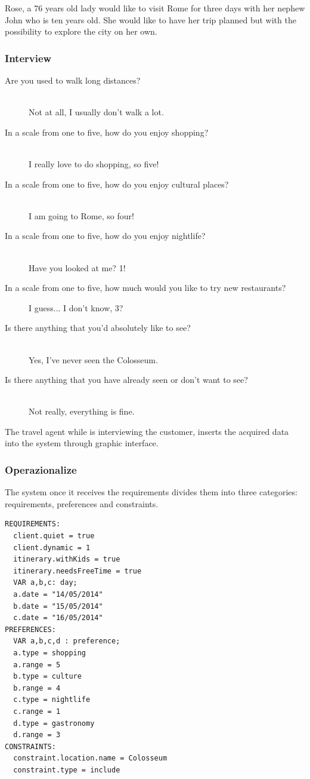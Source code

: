 \documentclass[11pt]{article} %
\begin{document}
Rose, a 76 years old lady would like to visit Rome for three days with her nephew John who is ten years old. She would like to have her trip planned but with the possibility to explore the city on her own. 

\subsubsection{Interview}

\begin{description}
  \item[Are you used to walk long distances?] \hfill \\
  Not at all, I usually don't walk a lot.
  \item[In a scale from one to five, how do you enjoy shopping?] \hfill \\
  I really love to do shopping, so five!
  \item[In a scale from one to five, how do you enjoy cultural places?] \hfill \\
  I am going to Rome, so four!
  \item[In a scale from one to five, how do you enjoy nightlife?] \hfill \\
  Have you looked at me? 1!
  \item[In a scale from one to five, how much would you like to try new restaurants?] \hfill 
  I guess... I don't know, 3?
  \item[Is there anything that you'd absolutely like to see?] \hfill \\
  Yes, I've never seen the Colosseum.
  \item[Is there anything that you have already seen or don't want to see?] \hfill \\
  Not really, everything is fine.
\end{description}

The travel agent while is interviewing the customer, inserts the acquired data into the system through graphic interface.

\subsubsection{Operazionalize}
The system once it receives the requirements divides them into three categories: requirements, preferences and constraints.

\begin{lstlisting}[breaklines=true,mathescape=true]
REQUIREMENTS:
  client.quiet = true
  client.dynamic = 1
  itinerary.withKids = true
  itinerary.needsFreeTime = true
  VAR a,b,c: day;
  a.date = "14/05/2014"
  b.date = "15/05/2014"
  c.date = "16/05/2014"
PREFERENCES:
  VAR a,b,c,d : preference;
  a.type = shopping
  a.range = 5
  b.type = culture
  b.range = 4
  c.type = nightlife
  c.range = 1
  d.type = gastronomy
  d.range = 3
CONSTRAINTS:
  constraint.location.name = Colosseum
  constraint.type = include
\end{lstlisting}
\end{document}
